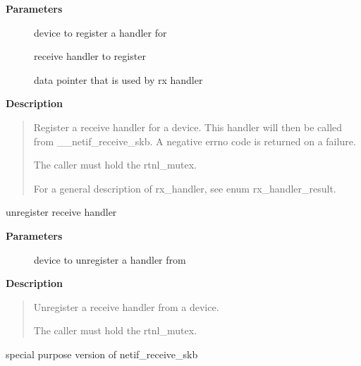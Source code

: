 \documentclass[a4paper,8pt,english]{sphinxmanual}
\begin{document}
\textbf{Parameters}
\begin{description}
\item[{}] \leavevmode
device to register a handler for

\item[{}] \leavevmode
receive handler to register

\item[{}] \leavevmode
data pointer that is used by rx handler

\end{description}

\textbf{Description}
\begin{quote}

Register a receive handler for a device. This handler will then be
called from \_\_netif\_receive\_skb. A negative errno code is returned
on a failure.

The caller must hold the rtnl\_mutex.

For a general description of rx\_handler, see enum rx\_handler\_result.
\end{quote}

\begin{fulllineitems}
\label{networking/kapi:c.netdev_rx_handler_unregister}
unregister receive handler

\end{fulllineitems}


\textbf{Parameters}
\begin{description}
\item[{}] \leavevmode
device to unregister a handler from

\end{description}

\textbf{Description}
\begin{quote}

Unregister a receive handler from a device.

The caller must hold the rtnl\_mutex.
\end{quote}

\begin{fulllineitems}
\label{networking/kapi:c.netif_receive_skb_core}
special purpose version of netif\_receive\_skb

\end{fulllineitems}
\end{document}
